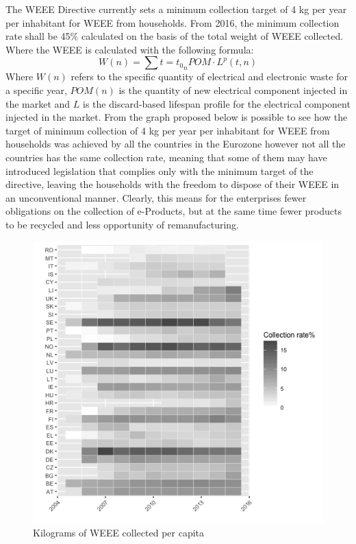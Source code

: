\begin{doublespace}
  The WEEE Directive currently sets a minimum collection target of 4 kg per year per inhabitant for WEEE from households. From 2016, the minimum collection rate shall be 45\% calculated on the basis of the total weight of WEEE collected. Where the WEEE is calculated with the following formula:
  $$
  W (n) = \sum{t = t_0}_{n} POM \cdot L^p(t,n)
  $$
   Where $W(n)$ refers to the specific quantity of electrical and electronic waste for a specific year, $POM(n)$ is the quantity of new electrical component injected in the market and $L$ is the discard-based lifespan profile for the electrical component injected in the market. From the graph proposed below is possible to see how the target of minimum collection of 4 kg per year per inhabitant for WEEE from households was achieved by all the countries in the Eurozone however not all the countries has the same collection rate, meaning that some of them may have introduced legislation that complies only with the minimum target of the directive, leaving the households with the freedom to dispose of their WEEE in an unconventional manner. Clearly, this means for the enterprises fewer obligations on the collection of e-Products, but at the same time fewer products to be recycled and less opportunity of remanufacturing.

  \begin{figure}
  \centering
  \includegraphics[width=1\linewidth]{Images/heatmap.png}
  \caption{Kilograms of WEEE collected per capita}
  \end{figure}


\end{doublespace}
